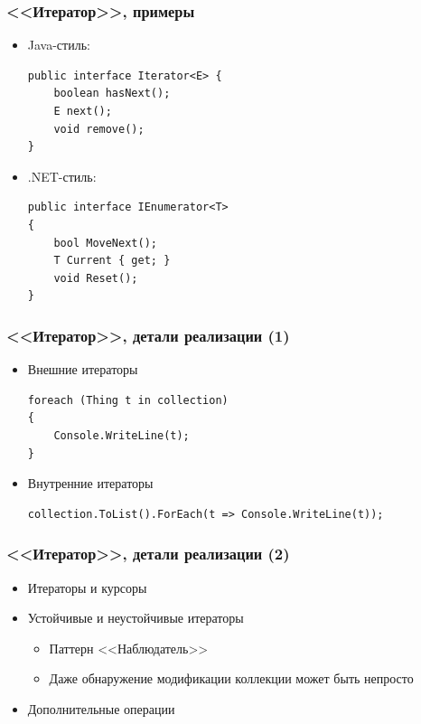 \documentclass[xetex,mathserif,serif]{beamer}
\begin{document}
    \begin{frame}[fragile]
        \frametitle{<<Итератор>>, примеры}
        \begin{itemize}
            \item Java-стиль:
            \begin{verbatim}
public interface Iterator<E> {
    boolean hasNext();
    E next();
    void remove();
}
            \end{verbatim}
            \item .NET-стиль:
            \begin{verbatim}
public interface IEnumerator<T>
{
    bool MoveNext();
    T Current { get; }
    void Reset();
}
            \end{verbatim}
        \end{itemize}
    \end{frame}

    \begin{frame}[fragile]
        \frametitle{<<Итератор>>, детали реализации (1)}
        \begin{itemize}
            \item Внешние итераторы
            \begin{verbatim}
foreach (Thing t in collection)
{
    Console.WriteLine(t);
} 
            \end{verbatim}
            \item Внутренние итераторы
            \begin{verbatim}
collection.ToList().ForEach(t => Console.WriteLine(t));
            \end{verbatim}
        \end{itemize}
    \end{frame}

    \begin{frame}
        \frametitle{<<Итератор>>, детали реализации (2)}
        \begin{itemize}
            \item Итераторы и курсоры
            \item Устойчивые и неустойчивые итераторы
            \begin{itemize}
                \item Паттерн <<Наблюдатель>>
                \item Даже обнаружение модификации коллекции может быть непросто
            \end{itemize}
            \item Дополнительные операции
        \end{itemize}
    \end{frame}
\end{document}
